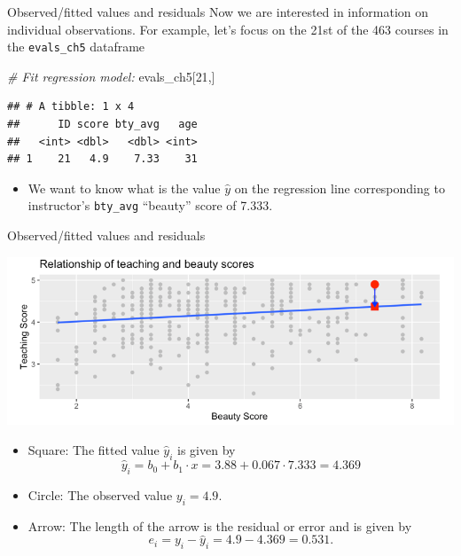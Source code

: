 \documentclass[
  ignorenonframetext,
]{beamer}
\newenvironment{Shaded}{\begin{snugshade}}{\end{snugshade}}
\newcommand{\CommentTok}[1]{\textcolor[rgb]{0.56,0.35,0.01}{\textit{#1}}}
\newcommand{\DecValTok}[1]{\textcolor[rgb]{0.00,0.00,0.81}{#1}}
\newcommand{\NormalTok}[1]{#1}
\providecommand{\tightlist}{%
  \setlength{\itemsep}{0pt}\setlength{\parskip}{0pt}}
\begin{document}
\begin{frame}[fragile]{Observed/fitted values and residuals}
\protect\hypertarget{observedfitted-values-and-residuals}{}
Now we are interested in information on individual observations. For
example, let's focus on the 21st of the 463 courses in the
\texttt{evals\_ch5} dataframe

\small

\begin{Shaded}
\begin{Highlighting}[]
\CommentTok{\# Fit regression model:}
\NormalTok{evals\_ch5[}\DecValTok{21}\NormalTok{,]}
\end{Highlighting}
\end{Shaded}

\begin{verbatim}
## # A tibble: 1 x 4
##      ID score bty_avg   age
##   <int> <dbl>   <dbl> <int>
## 1    21   4.9    7.33    31
\end{verbatim}

\normalsize

\begin{itemize}
\tightlist
\item
  We want to know what is the value \(\hat{y}\) on the regression line
  corresponding to instructor's \texttt{bty\_avg} ``beauty'' score of
  7.333.
\end{itemize}
\end{frame}

\begin{frame}{Observed/fitted values and residuals}
\protect\hypertarget{observedfitted-values-and-residuals-1}{}
\begin{center}\includegraphics[width=0.8\linewidth,height=0.45\textheight]{week4_4} \end{center}

\begin{itemize}
\tightlist
\item
  Square: The fitted value \(\hat{y}_i\) is given by
  \[\hat{y}_i=b_0+b_1\cdot x=3.88+0.067\cdot 7.333=4.369\]
\item
  Circle: The observed value \(y_i=4.9\).
\item
  Arrow: The length of the arrow is the residual or error and is given
  by \[e_i=y_i-\hat{y}_i=4.9-4.369=0.531.\]
\end{itemize}
\end{frame}
\end{document}

